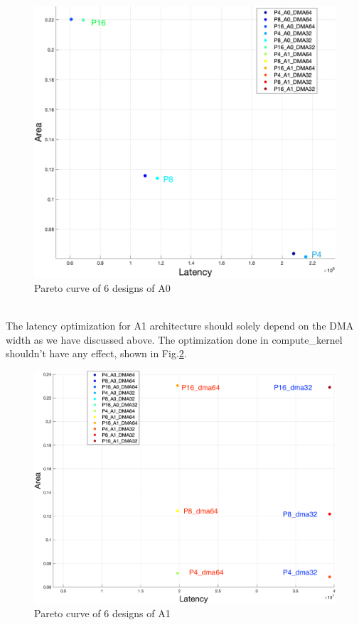 \documentclass{sig-alternate}
\begin{document}
\begin{figure}[h!]
    \centering
    \includegraphics[width=0.85\columnwidth]{figure/result_A0.png}
    \caption{Pareto curve of 6 designs of A0}
    \label{fig-paral}
\end{figure}
\\
The latency optimization for A1 architecture should solely depend on the DMA width as we have discussed above. The optimization done in compute\_kernel shouldn't have any effect, shown in Fig.\ref{fig-a1-pareto}.\\
\begin{figure}[h!]
    \centering
    \includegraphics[width=0.85\columnwidth]{figure/result_A1.png}
    \caption{Pareto curve of 6 designs of A1}
    \label{fig-a1-pareto}
\end{figure}
\end{document}
